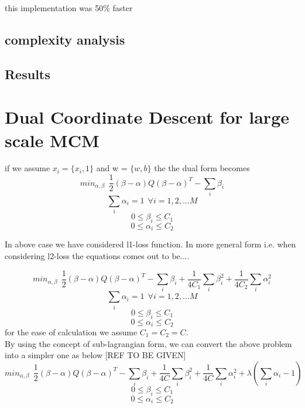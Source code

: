 this implementation was 50\% faster

\subsection{complexity analysis}
\subsection{Results}
\section{Dual Coordinate Descent for large scale MCM}
if we assume $x_i = \{x_i,1\}$ and w = $\{w ,b\}$
the the dual form becomes
\begin{equation}\label{mcmeq1}
min_{\alpha,\beta}\:\: \frac{1}{2}(\beta - \alpha)Q(\beta - \alpha)^T - \sum_i{\beta_i}
\end{equation}
\begin{equation}\label{mcmeq4}
\sum_i{\alpha_i} = 1 \:\:\forall i={1, 2, ... M}
\end{equation}
\begin{equation}\label{mcmeq2}
0 \leq \beta_i \leq C_1
\end{equation}
\begin{equation}\label{mcmeq3}
0 \leq \alpha_i \leq C_2
\end{equation}

In above case we have considered l1-loss function. In more general form i.e. when considering l2-loss the equations comes out to be....

\begin{equation}\label{mcmeq1}
min_{\alpha,\beta} \:\: \frac{1}{2}(\beta - \alpha)Q(\beta - \alpha)^T - \sum_i{\beta_i} + \frac{1}{4C_1}\sum_i{\beta_i^2} + \frac{1}{4C_2}\sum_i{\alpha_i^2}
\end{equation}
\begin{equation}\label{mcmeq4}
\sum_i{\alpha_i} = 1 \:\:\forall i={1, 2, ... M}
\end{equation}
\begin{equation}\label{mcmeq2}
0 \leq \beta_i \leq C_1
\end{equation}
\begin{equation}\label{mcmeq3}
0 \leq \alpha_i \leq C_2
\end{equation}
for the ease of calculation we assume $C_1 = C_2 = C$.\\
By using the concept of sub-lagrangian form, we can convert the above problem into a simpler one as below [REF TO BE GIVEN]
\begin{equation}\label{mcmeq1}
min_{\alpha,\beta} \:\: \frac{1}{2}(\beta - \alpha)Q(\beta - \alpha)^T - \sum_i{\beta_i} + \frac{1}{4C}\sum_i{\beta_i^2} + \frac{1}{4C}\sum_i{\alpha_i^2} + \lambda(\sum_i\alpha_i -1)
\end{equation}
\begin{equation}\label{mcmeq2}
0 \leq \beta_i \leq C_1
\end{equation}
\begin{equation}\label{mcmeq3}
0 \leq \alpha_i \leq C_2
\end{equation}

